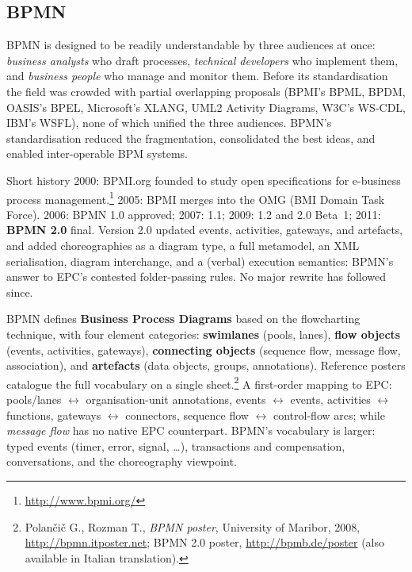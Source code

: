 \subsection{BPMN}

BPMN is designed to be readily understandable by three audiences at once: \emph{business analysts} who draft processes, \emph{technical developers} who implement them, and \emph{business people} who manage and monitor them. Before its standardisation the field was crowded with partial overlapping proposals (BPMI's BPML, BPDM, OASIS's BPEL, Microsoft's XLANG, UML2 Activity Diagrams, W3C's WS-CDL, IBM's WSFL), none of which unified the three audiences. BPMN's standardisation reduced the fragmentation, consolidated the best ideas, and enabled inter-operable BPM systems.

\begin{notebox}{Short history}
2000: BPMI.org founded to study open specifications for e-business process management.\footnote{\url{http://www.bpmi.org/}} 2005: BPMI merges into the OMG (BMI Domain Task Force). 2006: BPMN 1.0 approved; 2007: 1.1; 2009: 1.2 and 2.0 Beta~1; 2011: \textbf{BPMN 2.0} final. Version 2.0 updated events, activities, gateways, and artefacts, and added choreographies as a diagram type, a full metamodel, an XML serialisation, diagram interchange, and a (verbal) execution semantics: BPMN's answer to EPC's contested folder-passing rules. No major rewrite has followed since.
\end{notebox}

BPMN defines \textbf{Business Process Diagrams} based on the flowcharting technique, with four element categories: \textbf{swimlanes} (pools, lanes), \textbf{flow objects} (events, activities, gateways), \textbf{connecting objects} (sequence flow, message flow, association), and \textbf{artefacts} (data objects, groups, annotations). Reference posters catalogue the full vocabulary on a single sheet.\footnote{Polan\v{c}i\v{c} G., Rozman T., \emph{BPMN poster}, University of Maribor, 2008, \url{http://bpmn.itposter.net}; BPMN 2.0 poster, \url{http://bpmb.de/poster} (also available in Italian translation).} A first-order mapping to EPC: pools/lanes $\leftrightarrow$ organisation-unit annotations, events $\leftrightarrow$ events, activities $\leftrightarrow$ functions, gateways $\leftrightarrow$ connectors, sequence flow $\leftrightarrow$ control-flow arcs; while \emph{message flow} has no native EPC counterpart. BPMN's vocabulary is larger: typed events (timer, error, signal, \dots), transactions and compensation, conversations, and the choreography viewpoint.

